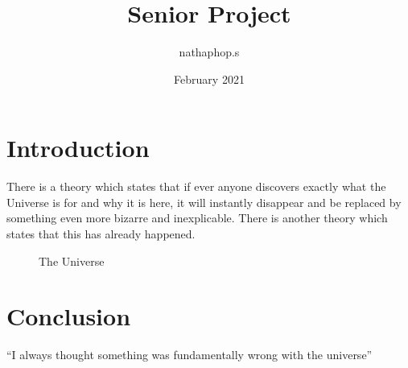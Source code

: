\documentclass{article}
\title{Senior Project}
\author{nathaphop.s }
\date{February 2021}
\begin{document}
	
	\maketitle
	
	\section{Introduction}
	There is a theory which states that if ever anyone discovers exactly what the Universe is for and why it is here, it will instantly disappear and be replaced by something even more bizarre and inexplicable.
	There is another theory which states that this has already happened.
	
	\begin{figure}[h!]
		\centering
		
		\caption{The Universe}
		\label{fig:universe}
	\end{figure}
	
	\section{Conclusion}
	``I always thought something was fundamentally wrong with the universe'' \citep{adams1995hitchhiker}
	
	
	
\end{document}
